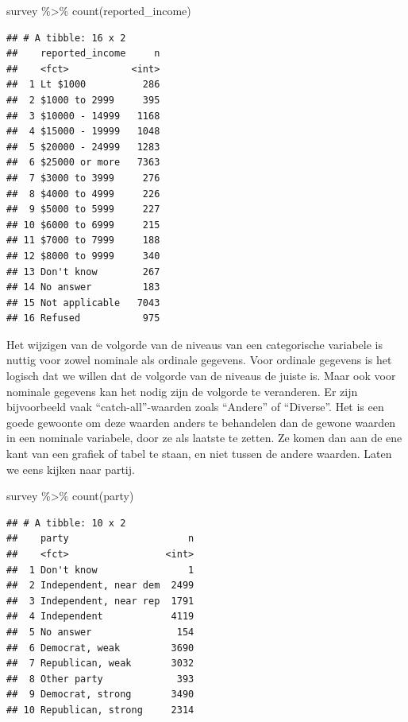 \documentclass[]{tufte-book}
\newenvironment{Shaded}{}{}
\newcommand{\FunctionTok}[1]{\textcolor[rgb]{0.02,0.16,0.49}{#1}}
\newcommand{\NormalTok}[1]{#1}
\newcommand{\SpecialCharTok}[1]{\textcolor[rgb]{0.25,0.44,0.63}{#1}}
\begin{document}
\begin{Shaded}
\begin{Highlighting}[]
\NormalTok{survey }\SpecialCharTok{\%\textgreater{}\%}
  \FunctionTok{count}\NormalTok{(reported\_income)}
\end{Highlighting}
\end{Shaded}

\begin{verbatim}
## # A tibble: 16 x 2
##    reported_income     n
##    <fct>           <int>
##  1 Lt $1000          286
##  2 $1000 to 2999     395
##  3 $10000 - 14999   1168
##  4 $15000 - 19999   1048
##  5 $20000 - 24999   1283
##  6 $25000 or more   7363
##  7 $3000 to 3999     276
##  8 $4000 to 4999     226
##  9 $5000 to 5999     227
## 10 $6000 to 6999     215
## 11 $7000 to 7999     188
## 12 $8000 to 9999     340
## 13 Don't know        267
## 14 No answer         183
## 15 Not applicable   7043
## 16 Refused           975
\end{verbatim}

Het wijzigen van de volgorde van de niveaus van een categorische variabele is nuttig voor zowel nominale als ordinale gegevens. Voor ordinale gegevens is het logisch dat we willen dat de volgorde van de niveaus de juiste is. Maar ook voor nominale gegevens kan het nodig zijn de volgorde te veranderen. Er zijn bijvoorbeeld vaak ``catch-all''-waarden zoals ``Andere'' of ``Diverse''. Het is een goede gewoonte om deze waarden anders te behandelen dan de gewone waarden in een nominale variabele, door ze als laatste te zetten. Ze komen dan aan de ene kant van een grafiek of tabel te staan, en niet tussen de andere waarden. Laten we eens kijken naar partij.

\begin{Shaded}
\begin{Highlighting}[]
\NormalTok{survey }\SpecialCharTok{\%\textgreater{}\%}
  \FunctionTok{count}\NormalTok{(party)}
\end{Highlighting}
\end{Shaded}

\begin{verbatim}
## # A tibble: 10 x 2
##    party                     n
##    <fct>                 <int>
##  1 Don't know                1
##  2 Independent, near dem  2499
##  3 Independent, near rep  1791
##  4 Independent            4119
##  5 No answer               154
##  6 Democrat, weak         3690
##  7 Republican, weak       3032
##  8 Other party             393
##  9 Democrat, strong       3490
## 10 Republican, strong     2314
\end{verbatim}
\end{document}
